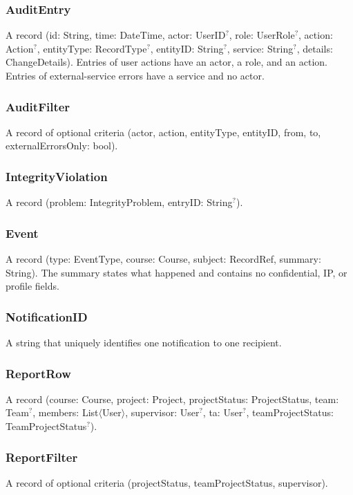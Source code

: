 \documentclass[12pt, titlepage]{article}
\begin{document}
\subsubsection{AuditEntry}
A record (id: String, time: DateTime, actor: UserID$^{?}$, role: UserRole$^{?}$,
action: Action$^{?}$, entityType: RecordType$^{?}$, entityID: String$^{?}$,
service: String$^{?}$, details: ChangeDetails). Entries of user actions have an actor, a role, and an action.
Entries of external-service errors have a service and no actor.

\subsubsection{AuditFilter}
A record of optional criteria (actor, action, entityType, entityID, from, to, externalErrorsOnly: bool).

\subsubsection{IntegrityViolation}
A record (problem: IntegrityProblem, entryID: String$^{?}$).

\subsubsection{Event}
A record (type: EventType, course: Course, subject: RecordRef, summary: String).
The summary states what happened and contains no confidential, IP, or profile fields.

\subsubsection{NotificationID}
A string that uniquely identifies one notification to one recipient.

\subsubsection{ReportRow}
A record (course: Course, project: Project, projectStatus: ProjectStatus, team:
Team$^{?}$, members: List$\langle$User$\rangle$, supervisor: User$^{?}$, ta: User$^{?}$,
teamProjectStatus: TeamProjectStatus$^{?}$).

\subsubsection{ReportFilter}
A record of optional criteria (projectStatus, teamProjectStatus, supervisor).
\end{document}
